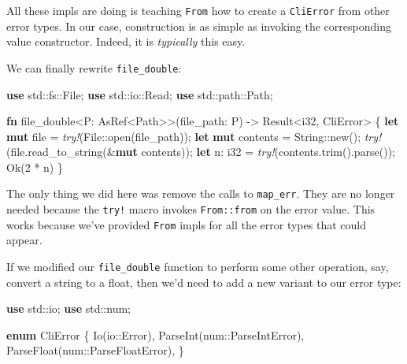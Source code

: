\documentclass[a4paper,]{book}
\newenvironment{Shaded}{\begin{snugshade}}{\end{snugshade}}
\newcommand{\KeywordTok}[1]{\textcolor[rgb]{0.13,0.29,0.53}{\textbf{{#1}}}}
\newcommand{\DataTypeTok}[1]{\textcolor[rgb]{0.13,0.29,0.53}{{#1}}}
\newcommand{\DecValTok}[1]{\textcolor[rgb]{0.00,0.00,0.81}{{#1}}}
\newcommand{\ConstantTok}[1]{\textcolor[rgb]{0.00,0.00,0.00}{{#1}}}
\newcommand{\PreprocessorTok}[1]{\textcolor[rgb]{0.56,0.35,0.01}{\textit{{#1}}}}
\newcommand{\NormalTok}[1]{{#1}}
\begin{document}
All these impls are doing is teaching \texttt{From} how to create a
\texttt{CliError} from other error types. In our case, construction is
as simple as invoking the corresponding value constructor. Indeed, it is
\emph{typically} this easy.

We can finally rewrite \texttt{file\_double}:

\begin{Shaded}
\begin{Highlighting}[]

\KeywordTok{use} \NormalTok{std::fs::File;}
\KeywordTok{use} \NormalTok{std::io::Read;}
\KeywordTok{use} \NormalTok{std::path::Path;}

\KeywordTok{fn} \NormalTok{file_double<P: AsRef<Path>>(file_path: P) -> }\DataTypeTok{Result}\NormalTok{<}\DataTypeTok{i32}\NormalTok{, CliError> \{}
    \KeywordTok{let} \KeywordTok{mut} \NormalTok{file = }\PreprocessorTok{try!}\NormalTok{(File::open(file_path));}
    \KeywordTok{let} \KeywordTok{mut} \NormalTok{contents = }\DataTypeTok{String}\NormalTok{::new();}
    \PreprocessorTok{try!}\NormalTok{(file.read_to_string(&}\KeywordTok{mut} \NormalTok{contents));}
    \KeywordTok{let} \NormalTok{n: }\DataTypeTok{i32} \NormalTok{= }\PreprocessorTok{try!}\NormalTok{(contents.trim().parse());}
    \ConstantTok{Ok}\NormalTok{(}\DecValTok{2} \NormalTok{* n)}
\NormalTok{\}}
\end{Highlighting}
\end{Shaded}

The only thing we did here was remove the calls to \texttt{map\_err}.
They are no longer needed because the \texttt{try!} macro invokes
\texttt{From::from} on the error value. This works because we've
provided \texttt{From} impls for all the error types that could appear.

If we modified our \texttt{file\_double} function to perform some other
operation, say, convert a string to a float, then we'd need to add a new
variant to our error type:

\begin{Shaded}
\begin{Highlighting}[]
\KeywordTok{use} \NormalTok{std::io;}
\KeywordTok{use} \NormalTok{std::num;}

\KeywordTok{enum} \NormalTok{CliError \{}
    \NormalTok{Io(io::Error),}
    \NormalTok{ParseInt(num::ParseIntError),}
    \NormalTok{ParseFloat(num::ParseFloatError),}
\NormalTok{\}}
\end{Highlighting}
\end{Shaded}
\end{document}
